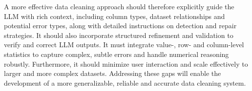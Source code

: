 A more effective data cleaning approach should therefore explicitly guide the LLM with rich context, including column types, dataset relationships and potential error types, along with detailed instructions on detection and repair strategies. 
It should also incorporate structured refinement and validation to verify and correct LLM outputs.
It must integrate value-, row- and column-level statistics to capture complex, subtle errors and handle numerical reasoning robustly. 
Furthermore, it should minimize user interaction and scale effectively to larger and more complex datasets. 
Addressing these gaps will enable the development of a more generalizable, reliable and accurate data cleaning system.